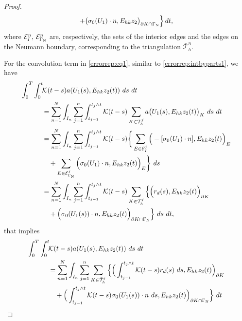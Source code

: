 \documentclass{amsart}
\numberwithin{equation}{section}
\theoremstyle{definition}
\begin{document}
\begin{proof}
\begin{equation}
\begin{split}
      +\big(\sigma_0(U_1)\cdot n,E_{hk}z_2\big)_{\partial K \cap \Gamma_{\text N}}
      \Big\}\,dt,
  \end{split}
\end{equation}
where ${\mathcal E}_I^n,\,{\mathcal E}_{\Gamma_{\text N}}^n$ are, respectively, the sets of the
interior edges and the edges on the Neumann boundary, corresponding to the triangulation $\bar{\mathcal T}_h^n$.

For the convolution term in \eqref{errorrep:eq1}, 
similar to \eqref{errorrep:intbyparts1}, we have
\begin{equation*}   
  \begin{split}
    \int_0^T\int_0^t\! &{\mathcal K}(t-s)a(U_1(s),E_{hk}z_2(t))\ ds\ dt\\
    &=\sum_{n=1}^N\int_{I_n} \sum_{j=1}^n\int_{t_{j-1}}^{t_j\wedge t}
       {\mathcal K}(t-s)\sum_{K\in\bar{\mathcal T}_h^j} a\big(U_1(s),E_{hk}z_2(t)\big)_K\ ds\  dt\\
    &=\sum_{n=1}^N\int_{I_n} \sum_{j=1}^n
       \int_{t_{j-1}}^{t_j\wedge t}{\mathcal K}(t-s) 
      \bigg\{ \sum_{E\in {\mathcal E}_I^j}
      \Big(-[\sigma_0(U_1)\cdot n],E_{hk}z_2(t) 
      \Big)_E\\
    &\quad+\sum_{E\in {\mathcal E}_{\Gamma_{\text N}}^j}
      \Big(\sigma_0(U_1)\cdot n,E_{hk}z_2(t) 
      \Big)_E\bigg\}\ ds\\
    &=\sum_{n=1}^N\int_{I_n} \sum_{j=1}^n
       \int_{t_{j-1}}^{t_j\wedge t}{\mathcal K}(t-s) \sum_{K\in\bar{\mathcal T}_h^j}
       \Big\{
       \Big(r_d(s),E_{hk}z_2(t)\Big)_{\partial K}\\
    &\quad  + \Big(\sigma_0(U_1(s))\cdot n,E_{hk}z_2(t) 
      \Big)_{\partial K \cap \Gamma_{\text N}}
       \Big\}\ ds\ dt,
  \end{split}
\end{equation*}
that implies
\begin{equation*}   
  \begin{split}
    \int_0^T\int_0^t\! &{\mathcal K}(t-s)a(U_1(s),E_{hk}z_2(t))\ ds\ dt\\
    &=\sum_{n=1}^N\int_{I_n} \sum_{j=1}^n
       \sum_{K\in\bar{\mathcal T}_h^j}
       \Big\{
       \Big(\int_{t_{j-1}}^{t_j\wedge t}{\mathcal K}(t-s) r_d(s)\ ds,
        E_{hk}z_2(t)\Big)_{\partial K}\\
    &\quad  
      +\Big(\int_{t_{j-1}}^{t_j\wedge t}{\mathcal K}(t-s) \sigma_0(U_1(s))\cdot n\ ds,
        E_{hk}z_2(t) 
      \Big)_{\partial K \cap \Gamma_{\text N}}
       \Big\}\ dt\\

\end{split}
\end{equation*}
\end{proof}
\end{document}
